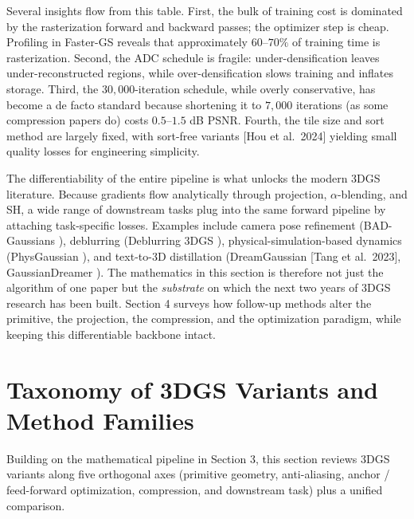 \documentclass{article}
\begin{document}
Several insights flow from this table. First, the bulk of training cost is dominated by the rasterization forward and backward passes; the optimizer step is cheap. Profiling in Faster-GS \cite{hahlbohm2026fastergsanalyzinga} reveals that approximately \(60\)--\(70\%\) of training time is rasterization. Second, the ADC schedule is fragile: under-densification leaves under-reconstructed regions, while over-densification slows training and inflates storage. Third, the \(30{,}000\)-iteration schedule, while overly conservative, has become a de facto standard because shortening it to \(7{,}000\) iterations (as some compression papers do) costs \(0.5\)--\(1.5\) dB PSNR. Fourth, the tile size and sort method are largely fixed, with sort-free variants {[}Hou et al.~2024{]} yielding small quality losses for engineering simplicity.

The differentiability of the entire pipeline is what unlocks the modern 3DGS literature. Because gradients flow analytically through projection, \(\alpha\)-blending, and SH, a wide range of downstream tasks plug into the same forward pipeline by attaching task-specific losses. Examples include camera pose refinement (BAD-Gaussians \cite{zhao2024badgaussiansbundle}), deblurring (Deblurring 3DGS \cite{lee2024compact3dgaussianr}), physical-simulation-based dynamics (PhysGaussian \cite{xie2024physgaussianphysic}), and text-to-3D distillation (DreamGaussian {[}Tang et al.~2023{]}, GaussianDreamer \cite{yi2024gaussiandreamerfas}). The mathematics in this section is therefore not just the algorithm of one paper but the \emph{substrate} on which the next two years of 3DGS research has been built. Section 4 surveys how follow-up methods alter the primitive, the projection, the compression, and the optimization paradigm, while keeping this differentiable backbone intact.

\section{Taxonomy of 3DGS Variants and Method Families}\label{taxonomy-of-3dgs-variants-and-method-families}

Building on the mathematical pipeline in Section 3, this section reviews 3DGS variants along five orthogonal axes (primitive geometry, anti-aliasing, anchor / feed-forward optimization, compression, and downstream task) plus a unified comparison.
\end{document}
